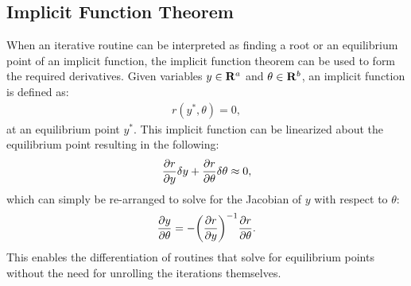 \subsection{Implicit Function Theorem}
When an iterative routine can be interpreted as finding a root or an equilibrium point of an implicit function, the implicit function theorem can be used to form the required derivatives. Given variables $y \in \mathbf{R}^{a}$ and $\theta \in \mathbf{R}^{b}$, an implicit function is defined as:
\begin{align}
    r(y^*, \theta) = 0,
\end{align}
at an equilibrium point $y^*$. This implicit function can be linearized about the equilibrium point resulting in the following:
\begin{align}
    \frac{\partial { r }}{ \partial { y }} \delta y + \frac{\partial { r }}{ \partial { \theta }} \delta \theta \approx 0 ,
\end{align}
which can simply be re-arranged to solve for the Jacobian of $y$ with respect to $\theta$:
\begin{align}
    \frac{\partial { y }}{ \partial { \theta }} = -\bigg(\frac{\partial { r }}{ \partial { y }} \bigg)^{-1} \frac{\partial { r }}{ \partial { \theta }}. \label{sec:background:ift}
\end{align}
This enables the differentiation of routines that solve for equilibrium points without the need for unrolling the iterations themselves. 
%
